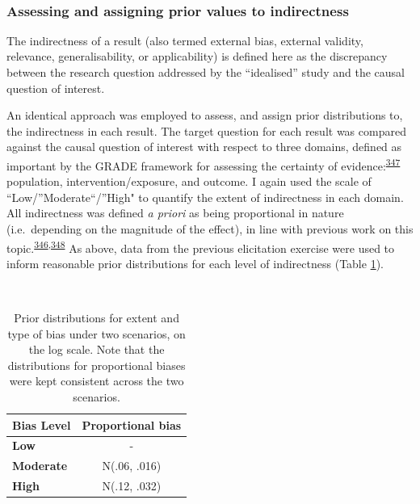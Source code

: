 \documentclass[a4paper, twoside]{templates/ociamthesis}
\begin{document}
~

\hypertarget{assessing-and-assigning-prior-values-to-indirectness}{%
\subsubsection{Assessing and assigning prior values to indirectness}\label{assessing-and-assigning-prior-values-to-indirectness}}

The indirectness of a result (also termed external bias, external validity, relevance, generalisability, or applicability) is defined here as the discrepancy between the research question addressed by the ``idealised'' study and the causal question of interest.

An identical approach was employed to assess, and assign prior distributions to, the indirectness in each result. The target question for each result was compared against the causal question of interest with respect to three domains, defined as important by the GRADE framework for assessing the certainty of evidence:\textsuperscript{\protect\hyperlink{ref-guyatt2011}{347}} population, intervention/exposure, and outcome. I again used the scale of ``Low/''Moderate``/''High" to quantify the extent of indirectness in each domain. All indirectness was defined \emph{a priori} as being proportional in nature (i.e.~depending on the magnitude of the effect), in line with previous work on this topic.\textsuperscript{\protect\hyperlink{ref-turner2009}{346},\protect\hyperlink{ref-thompson2011}{348}} As above, data from the previous elicitation exercise were used to inform reasonable prior distributions for each level of indirectness (Table \ref{tab:priorsIndirect-table}).

~





\begin{table}[H]

\caption[Prior distributions mapped to different extents of bias.]{\label{tab:priorsIndirect-table}Prior distributions for extent and type of bias under two scenarios, on the log scale. Note that the distributions for proportional biases were kept consistent across the two scenarios.}
\centering
\begin{tabular}[t]{>{}lc}
\toprule
\textbf{Bias Level} & \textbf{Proportional bias}\\
\midrule
\textbf{Low} & -\\
\midrule
\textbf{Moderate} & N(.06, .016)\\
\midrule
\textbf{High} & N(.12, .032)\\
\bottomrule
\end{tabular}
\end{table}
\end{document}
